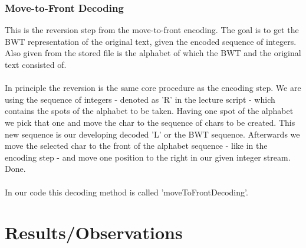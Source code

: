 \documentclass[11pt, notitlepage]{scrartcl}
\begin{document}
\subsubsection{Move-to-Front Decoding}
This is the reversion step from the move-to-front encoding. The goal is to get the BWT representation of the original
text, given the encoded sequence of integers. Also given from the stored file is the alphabet of which the BWT and the
original text consisted of. \\\\
In principle the reversion is the same core procedure as the encoding step. We are using the sequence of integers -
denoted as 'R' in the lecture script - which contains the spots of the alphabet to be taken. Having one spot of the
alphabet we pick that one and move the char to the sequence of chars to be created. This new sequence is our developing
decoded 'L' or the BWT sequence. Afterwards we move the selected char to the front of the alphabet sequence - like in
the encoding step - and move one position to the right in our given integer stream. Done. \\\\
In our code this decoding method is called 'moveToFrontDecoding'.
\section{Results/Observations}
\end{document}
